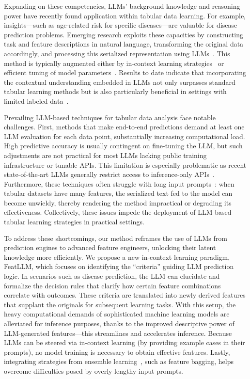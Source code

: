 Expanding on these competencies, LLMs’ background knowledge and reasoning power have recently found application within tabular data learning. For example, insights—such as age-related risk for specific diseases—are valuable for disease prediction problems. Emerging research exploits these capacities by constructing task and feature descriptions in natural language, transforming the original data accordingly, and processing this serialized representation using LLMs~\cite{dinh2022lift,wang2023anypredict}. This method is typically augmented either by in-context learning strategies~\cite{nam2023semi} or efficient tuning of model parameters~\cite{dinh2022lift,hegselmann2023tabllm}. Results to date indicate that incorporating the contextual understanding embedded in LLMs not only surpasses standard tabular learning methods but is also particularly beneficial in settings with limited labeled data~\cite{hegselmann2023tabllm}.

Prevailing LLM-based techniques for tabular data analysis face notable challenges. First, methods that make end-to-end predictions demand at least one LLM evaluation for each data point, substantially increasing computational load. High predictive accuracy is usually contingent on fine-tuning the LLM, but such adjustments are not practical for most LLMs lacking public training infrastructure or tunable APIs. This limitation is especially problematic as recent state-of-the-art LLMs generally restrict access to inference-only APIs~\cite{anil2023palm,openai2023gpt4}. Furthermore, these techniques often struggle with long input prompts~\cite{liu2023lost}: when tabular datasets have many features, the serialized text fed to the model can become unwieldy, thereby rendering the method impractical or degrading its effectiveness. Collectively, these issues impede the deployment of LLM-based tabular learning strategies in practical settings.

To address these shortcomings, our method reframes the use of LLMs from prediction engines to advanced feature engineers, unlocking their latent knowledge more efficiently. We propose a new in-context learning paradigm, \textsf{FeatLLM}, which focuses on identifying the “criteria” guiding LLM prediction logic. In scenarios such as disease prediction, the LLM can elucidate and formalize the decision rules that clarify how certain feature combinations correlate with outcomes. These criteria are translated into newly derived features that supplant the originals for subsequent learning tasks. With this setup, the heavy computational demands of sophisticated machine learning models are alleviated for inference purposes, thanks to the improved descriptive power of LLM-generated features—this streamlines and accelerates inference. Because LLMs can be steered via in-context learning (by providing example cases in their prompts), no model training is necessary to obtain effective features. Lastly, integrating strategies from ensemble learning~\cite{breiman2001random}, such as feature bagging, helps overcome difficulties posed by overly lengthy input prompts.

